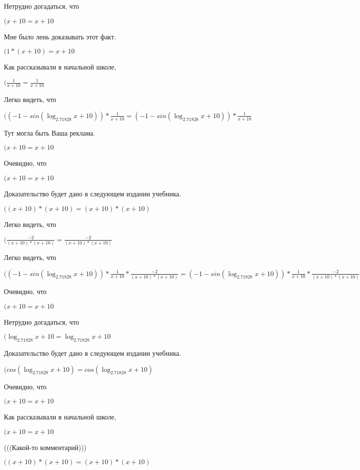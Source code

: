\documentclass[12pt,a4paper,fleqn]{article}
\theoremstyle{definition}
\begin{document}
Нетрудно догадаться, что

$( x  +  10  =  x  +  10 $

Мне было лень доказывать этот факт.

$( 1  * ( x  +  10 ) =  x  +  10 $

Как рассказывали в начальной школе,

$(\frac{ 1 }{ x  +  10 }
 = \frac{ 1 }{ x  +  10 }
$

Легко видеть, что

$(( -1  - sin(\log_{ 2.71828 }{ x  +  10 })) * \frac{ 1 }{ x  +  10 }
 = ( -1  - sin(\log_{ 2.71828 }{ x  +  10 })) * \frac{ 1 }{ x  +  10 }
$

Тут могла быть Ваша реклама.

$( x  +  10  =  x  +  10 $

Очевидно, что

$( x  +  10  =  x  +  10 $

Доказательство будет дано в следующем издании учебника.

$(( x  +  10 ) * ( x  +  10 ) = ( x  +  10 ) * ( x  +  10 )$

Легко видеть, что

$(\frac{ -2 }{( x  +  10 ) * ( x  +  10 )}
 = \frac{ -2 }{( x  +  10 ) * ( x  +  10 )}
$

Легко видеть, что

$(( -1  - sin(\log_{ 2.71828 }{ x  +  10 })) * \frac{ 1 }{ x  +  10 }
 * \frac{ -2 }{( x  +  10 ) * ( x  +  10 )}
 = ( -1  - sin(\log_{ 2.71828 }{ x  +  10 })) * \frac{ 1 }{ x  +  10 }
 * \frac{ -2 }{( x  +  10 ) * ( x  +  10 )}
$

Очевидно, что

$( x  +  10  =  x  +  10 $

Нетрудно догадаться, что

$(\log_{ 2.71828 }{ x  +  10 } = \log_{ 2.71828 }{ x  +  10 }$

Доказательство будет дано в следующем издании учебника.

$(cos(\log_{ 2.71828 }{ x  +  10 }) = cos(\log_{ 2.71828 }{ x  +  10 })$

Очевидно, что

$( x  +  10  =  x  +  10 $

Как рассказывали в начальной школе,

$( x  +  10  =  x  +  10 $

(((Какой-то комментарий)))

$(( x  +  10 ) * ( x  +  10 ) = ( x  +  10 ) * ( x  +  10 )$
\end{document}

